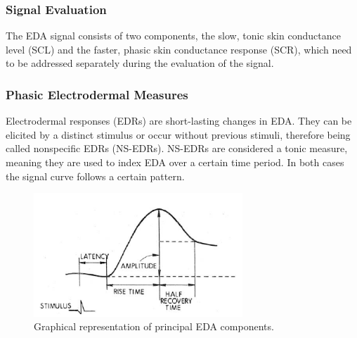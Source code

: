 \subsubsection{Signal Evaluation}
The EDA signal consists of two components, the slow, tonic skin conductance level (SCL) and the faster, phasic skin conductance response (SCR), which need to be addressed separately during the evaluation of the signal.

\subsubsection{Phasic Electrodermal Measures}
Electrodermal responses (EDRs) are short-lasting changes in EDA. They can be elicited by a distinct stimulus or occur without previous stimuli, therefore being called nonspecific EDRs (NS-EDRs). NS-EDRs are considered a tonic measure, meaning they are used to index EDA over a certain time period. In both cases the signal curve follows a certain pattern.

\begin{figure}[ht]
\centering
\includegraphics[width=0.7\textwidth]{images/SCR.png}
\caption{Graphical representation of principal EDA components.}
\label{SCRImg}
\end{figure}

